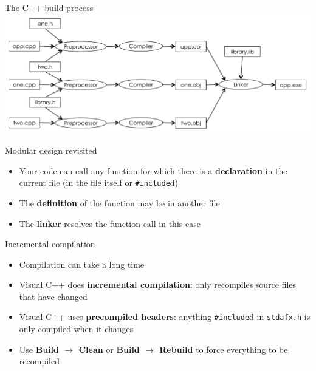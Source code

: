 \begin{frame}[fragile]{The C++ build process}
    \includegraphics[width=\textwidth]{compiler_flowchart.pdf}
\end{frame}

\begin{frame}[fragile]{Modular design revisited}
    \begin{itemize}
        \item Your code can call any function for which there is a \textbf{declaration} in the current file
            (in the file itself or \lstinline{#include}d) \pause
        \item The \textbf{definition} of the function may be in another file \pause
        \item The \textbf{linker} resolves the function call in this case
    \end{itemize}
\end{frame}

\begin{frame}[fragile]{Incremental compilation}
    \begin{itemize}
        \item Compilation can take a long time \pause
        \item Visual C++ does \textbf{incremental compilation}: only recompiles source files that have changed \pause
        \item Visual C++ uses \textbf{precompiled headers}: anything \lstinline{#include}d in \texttt{stdafx.h}
            is only compiled when it changes \pause
        \item Use \textbf{Build $\to$ Clean} or \textbf{Build $\to$ Rebuild} to force everything to be recompiled
    \end{itemize}
\end{frame}

